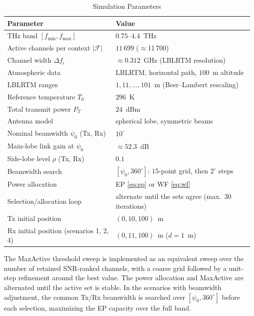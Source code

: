 \documentclass{ieee-ojvt}
\newcommand{\PLNCH}{11\,700}          %
\begin{document}
\begin{table}[!t]
\caption{Simulation Parameters}
\label{tab:simparams}
\setlength{\tabcolsep}{3pt}
\begin{tabular*}{\columnwidth}{@{}p{}@{\extracolsep{\fill}}p{}@{}}
\hline
Parameter & Value\\
\hline
THz band $[f_{\min},f_{\max}]$ & $0.75$--$4.4$~THz\\
Active channels per context $|\mathcal{F}|$ & $11\,699$ ($\approx$\PLNCH{})\\
Channel width $\Delta f_i$ & $\approx0.312$~GHz (LBLRTM resolution)\\
Atmospheric data & LBLRTM, horizontal path, $100$~m altitude\\
LBLRTM ranges & $1,11,\dots,101$~m (Beer--Lambert rescaling)\\
Reference temperature $T_0$ & $296$~K\\
Total transmit power $P_T$ & $24$~dBm\\
Antenna model & spherical lobe, symmetric beams\\
Nominal beamwidth $\psi_0$ (Tx, Rx) & $10^\circ$\\
Main-lobe link gain at $\psi_0$ & $\approx52.3$~dB\\
Side-lobe level $\rho$ (Tx, Rx) & $0.1$\\
Beamwidth search & $[\psi_0,360^\circ]$: $15$-point grid, then $2^\circ$ steps\\
Power allocation & EP \eqref{eq:ep} or WF \eqref{eq:wf}\\
Selection/allocation loop & alternate until the sets agree (max.\ $30$ iterations)\\
Tx initial position & $(0,10,100)$~m\\
Rx initial position (scenarios 1, 2, 4) & $(0,11,100)$~m ($d=1$~m)\\
\hline
\end{tabular*}
\end{table}

The MaxActive threshold sweep is implemented as an equivalent sweep over the number of
retained SNR-ranked channels, with a coarse grid followed by a unit-step refinement around
the best value. The power allocation and MaxActive are alternated until the active set is
stable. In the scenarios with beamwidth adjustment, the common Tx/Rx beamwidth is searched
over $[\psi_0,360^\circ]$ before each selection, maximizing the EP capacity over the full
band.
\end{document}
